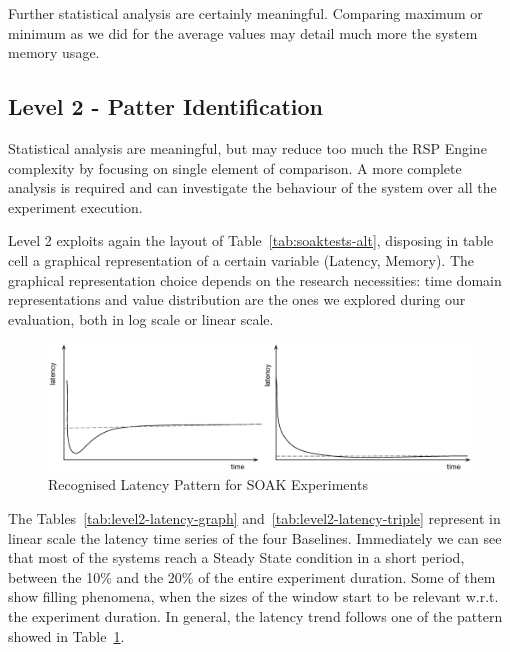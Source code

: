 Further statistical analysis are certainly meaningful. Comparing maximum or minimum as we did for the average values may detail much more the system memory usage. %

\subsection{Level 2 - Patter Identification}\label{sec:eval-level2}

Statistical analysis are meaningful, but may reduce too much the RSP Engine complexity by focusing on single element of comparison. A more complete analysis is required and \name can investigate the behaviour of the system over all the experiment execution.

Level 2 exploits again the layout of Table~\ref{tab:soaktests-alt}, disposing in table cell a graphical representation of a certain variable (Latency, Memory). The graphical representation choice depends on the research necessities: time domain representations and value distribution are the ones we explored during our evaluation, both in log scale or linear scale.

\begin{figure}[h!tbp]
  \centering
	\includegraphics[width=\linewidth]{images/level2-pattern}
	\caption[\textsc{Analyser} Investigation Stack - Level 2 - Recognised Latency Patterns for SOAK Experiments]{Recognised Latency Pattern for SOAK Experiments} 
  	\label{fig:level2-pattern}
\end{figure}

The Tables~\ref{tab:level2-latency-graph} and~\ref{tab:level2-latency-triple} represent in linear scale the latency time series of the four Baselines. Immediately we can see that most of the systems reach a Steady State condition in a short period, between the 10\% and the 20\% of the entire experiment duration. Some of them show filling phenomena, when the sizes of the window start to be relevant w.r.t. the experiment duration. In general, the latency trend follows one of the pattern showed in Table~\ref{fig:level2-pattern}. %

